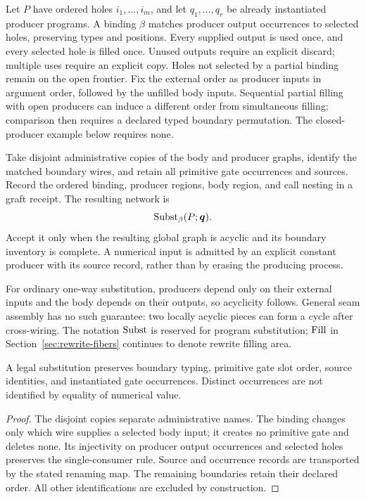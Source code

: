 Let $P$ have ordered holes $i_1,\ldots,i_m$, and let $q_1,\ldots,q_r$ be
already instantiated producer programs.  A binding $\beta$ matches producer
output occurrences to selected holes, preserving types and positions.  Every
supplied output is used once, and every selected hole is filled once.  Unused
outputs require an explicit discard; multiple uses require an explicit copy.
Holes not selected by a partial binding remain on the open frontier.  Fix the
external order as producer inputs in argument order, followed by the unfilled
body inputs.  Sequential partial filling with open producers can induce a
different order from simultaneous filling; comparison then requires a declared
typed boundary permutation.  The closed-producer example below requires none.

\begin{construction}
\label{constr:certified-substitution}
Take disjoint administrative copies of the body and producer graphs, identify
the matched boundary wires, and retain all primitive gate occurrences and
sources.  Record the ordered binding, producer regions, body region, and call
nesting in a graft receipt.  The resulting network is
\[
  \operatorname{Subst}_\beta(P;\boldsymbol q).
\]
Accept it only when the resulting global graph is acyclic and its boundary
inventory is complete.  A numerical input is admitted by an explicit constant
producer with its source record, rather than by erasing the producing process.
\end{construction}

For ordinary one-way substitution, producers depend only on their external
inputs and the body depends on their outputs, so acyclicity follows.  General
seam assembly has no such guarantee: two locally acyclic pieces can form a
cycle after cross-wiring.  The notation $\operatorname{Subst}$ is reserved for program
substitution; $\operatorname{Fill}$ in Section~\ref{sec:rewrite-fibers} continues to denote
rewrite filling area.

\begin{proposition}
\label{prop:ported-substitution-preservation}
A legal substitution preserves boundary typing, primitive gate slot order,
source identities, and instantiated gate occurrences.  Distinct occurrences
are not identified by equality of numerical value.
\end{proposition}
\begin{proof}
The disjoint copies separate administrative names.  The binding changes only
which wire supplies a selected body input; it creates no primitive gate and
deletes none.  Its injectivity on producer output occurrences and selected
holes preserves the single-consumer rule.  Source and occurrence records are
transported by the stated renaming map.  The remaining boundaries retain their
declared order.  All other identifications are excluded by construction.
\end{proof}

